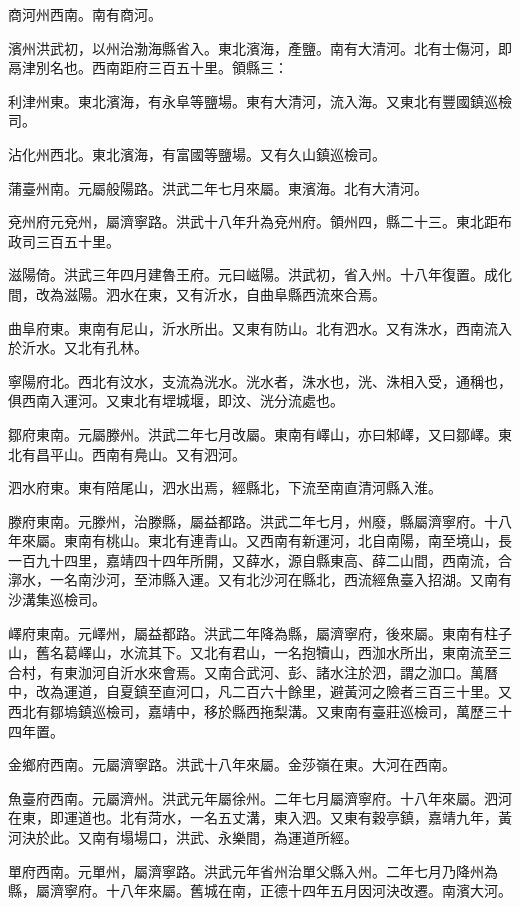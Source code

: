 商河州西南。南有商河。

濱州洪武初，以州治渤海縣省入。東北濱海，產鹽。南有大清河。北有士傷河，即鬲津別名也。西南距府三百五十里。領縣三：

利津州東。東北濱海，有永阜等鹽場。東有大清河，流入海。又東北有豐國鎮巡檢司。

沾化州西北。東北濱海，有富國等鹽場。又有久山鎮巡檢司。

蒲臺州南。元屬般陽路。洪武二年七月來屬。東濱海。北有大清河。

兗州府元兗州，屬濟寧路。洪武十八年升為兗州府。領州四，縣二十三。東北距布政司三百五十里。

滋陽倚。洪武三年四月建魯王府。元曰嵫陽。洪武初，省入州。十八年復置。成化間，改為滋陽。泗水在東，又有沂水，自曲阜縣西流來合焉。

曲阜府東。東南有尼山，沂水所出。又東有防山。北有泗水。又有洙水，西南流入於沂水。又北有孔林。

寧陽府北。西北有汶水，支流為洸水。洸水者，洙水也，洸、洙相入受，通稱也，俱西南入運河。又東北有堽城堰，即汶、洸分流處也。

鄒府東南。元屬滕州。洪武二年七月改屬。東南有嶧山，亦曰邾嶧，又曰鄒嶧。東北有昌平山。西南有鳧山。又有泗河。

泗水府東。東有陪尾山，泗水出焉，經縣北，下流至南直清河縣入淮。

滕府東南。元滕州，治滕縣，屬益都路。洪武二年七月，州廢，縣屬濟寧府。十八年來屬。東南有桃山。東北有連青山。又西南有新運河，北自南陽，南至境山，長一百九十四里，嘉靖四十四年所開，又薛水，源自縣東高、薛二山間，西南流，合漷水，一名南沙河，至沛縣入運。又有北沙河在縣北，西流經魚臺入招湖。又南有沙溝集巡檢司。

嶧府東南。元嶧州，屬益都路。洪武二年降為縣，屬濟寧府，後來屬。東南有柱子山，舊名葛嶧山，水流其下。又北有君山，一名抱犢山，西泇水所出，東南流至三合村，有東泇河自沂水來會焉。又南合武河、彭、諸水注於泗，謂之泇口。萬曆中，改為運道，自夏鎮至直河口，凡二百六十餘里，避黃河之險者三百三十里。又西北有鄒塢鎮巡檢司，嘉靖中，移於縣西拖梨溝。又東南有臺莊巡檢司，萬歷三十四年置。

金鄉府西南。元屬濟寧路。洪武十八年來屬。金莎嶺在東。大河在西南。

魚臺府西南。元屬濟州。洪武元年屬徐州。二年七月屬濟寧府。十八年來屬。泗河在東，即運道也。北有菏水，一名五丈溝，東入泗。又東有穀亭鎮，嘉靖九年，黃河決於此。又南有塌場口，洪武、永樂間，為運道所經。

單府西南。元單州，屬濟寧路。洪武元年省州治單父縣入州。二年七月乃降州為縣，屬濟寧府。十八年來屬。舊城在南，正德十四年五月因河決改遷。南濱大河。

